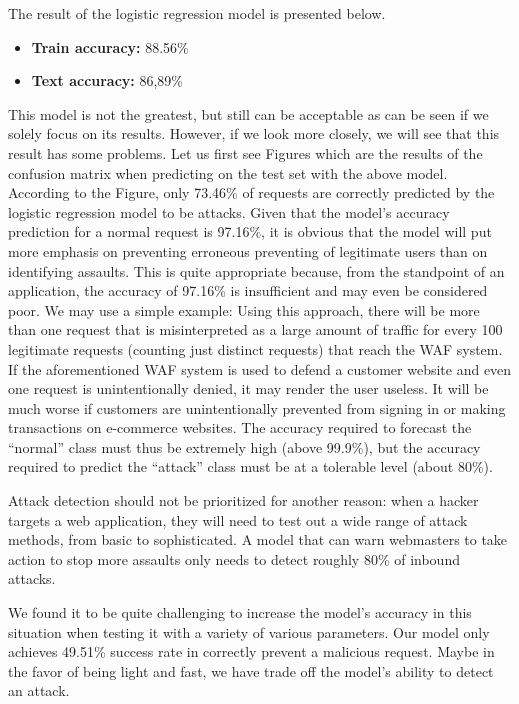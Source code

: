 The result of the logistic regression model is presented below.
\begin{itemize}
	\item \textbf{Train accuracy:} 88.56\%
	\item \textbf{Text accuracy:} 86,89\%
\end{itemize}

This model is not the greatest, but still can be acceptable as can be seen if we solely focus on its results. However, if we look more closely, we will see that this result has some problems. Let us first see Figures which are the results of the confusion matrix when predicting on the test set with the above model. According to the Figure, only 73.46\% of requests are correctly predicted by the logistic regression model to be attacks. Given that the model's accuracy prediction for a normal request is 97.16\%, it is obvious that the model will put more emphasis on preventing erroneous preventing of legitimate users than on identifying assaults. This is quite appropriate because, from the standpoint of an application, the accuracy of 97.16\% is insufficient and may even be considered poor. We may use a simple example: Using this approach, there will be more than one request that is misinterpreted as a large amount of traffic for every 100 legitimate requests (counting just distinct requests) that reach the WAF system. If the aforementioned WAF system is used to defend a customer website and even one request is unintentionally denied, it may render the user useless. It will be much worse if customers are unintentionally prevented from signing in or making transactions on e-commerce websites. The accuracy required to forecast the ``normal'' class must thus be extremely high (above 99.9\%), but the accuracy required to predict the ``attack'' class must be at a tolerable level (about 80\%).

Attack detection should not be prioritized for another reason: when a hacker targets a web application, they will need to test out a wide range of attack methods, from basic to sophisticated. A model that can warn webmasters to take action to stop more assaults only needs to detect roughly 80\% of inbound attacks.

We found it to be quite challenging to increase the model's accuracy in this situation when testing it with a variety of various parameters. Our model only achieves 49.51\% success rate in correctly prevent a malicious request. Maybe in the favor of being light and fast, we have trade off the model's ability to detect an attack.

